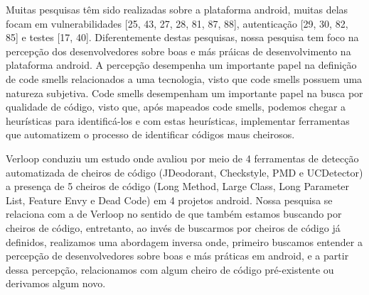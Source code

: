 Muitas pesquisas t\^em sido realizadas sobre a plataforma android, muitas delas focam em vulnerabilidades [25, 43, 27, 28, 81, 87, 88], autentica\c{c}\~ao [29, 30, 82, 85] e testes [17, 40]. Diferentemente destas pesquisas, nossa pesquisa tem foco na percep\c{c}\~ao dos desenvolvedores sobre boas e m\'as pr\'aicas de desenvolvimento na plataforma android. A percep\c{c}\~ao desempenha um importante papel na defini\c{c}\~ao de code smells relacionados a uma tecnologia, visto que code smells possuem uma natureza subjetiva. Code smells desempenham um importante papel na busca por qualidade de c\'odigo, visto que, ap\'os mapeados code smells, podemos chegar a heur\'isticas para identific\'a-los e com estas heur\'isticas, implementar ferramentas que automatizem o processo de identificar c\'odigos maus cheirosos.

Verloop \cite{verloop:13} conduziu um estudo onde avaliou por meio de 4 ferramentas de detec\c{c}\~ao automatizada de cheiros de c\'odigo (JDeodorant, Checkstyle, PMD e UCDetector) a presen\c{c}a de 5 cheiros de c\'odigo (Long Method, Large Class, Long Parameter List, Feature Envy e Dead Code) em 4 projetos android. Nossa pesquisa se relaciona com a de Verloop no sentido de que tamb\'em estamos buscando por cheiros de c\'odigo, entretanto, ao inv\'es de buscarmos por cheiros de c\'odigo j\'a definidos, realizamos uma abordagem inversa onde, primeiro buscamos entender a percep\c{c}\~ao de desenvolvedores sobre boas e m\'as pr\'aticas em android, e a partir dessa percep\c{c}\~ao, relacionamos com algum cheiro de c\'odigo pr\'e-existente ou derivamos algum novo.